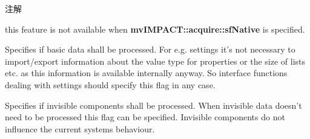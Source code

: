 \begin{Desc}
\begin{description}
\begin{DoxyNote}{注解}
\begin{DoxyItemize}
\item this feature is not available when {\bfseries mv\+I\+M\+P\+A\+C\+T\+::acquire\+::sf\+Native} is specified. 
\end{DoxyItemize}
\end{DoxyNote}
\item[{\em 
\hypertarget{group___common_interface_gga9390ccf3b2ebe68eee998798d59dc823a228c5c902dc7914659801cb9ca1b7a5b}{sf\+Ignore\+Basic\+Data}\label{group___common_interface_gga9390ccf3b2ebe68eee998798d59dc823a228c5c902dc7914659801cb9ca1b7a5b}
}]Specifies if basic data shall be processed. For e.\+g. settings it's not necessary to import/export information about the value type for properties or the size of lists etc. as this information is available internally anyway. So interface functions dealing with settings should specify this flag in any case. \item[{\em 
\hypertarget{group___common_interface_gga9390ccf3b2ebe68eee998798d59dc823a36c9dc84d7a21a51124a78a24c8b3d5c}{sf\+Ignore\+Invisible}\label{group___common_interface_gga9390ccf3b2ebe68eee998798d59dc823a36c9dc84d7a21a51124a78a24c8b3d5c}
}]Specifies if invisible components shall be processed. When invisible data doesn't need to be processed this flag can be specified. Invisible components do not influence the current systems behaviour.


\end{description}
\end{Desc}
